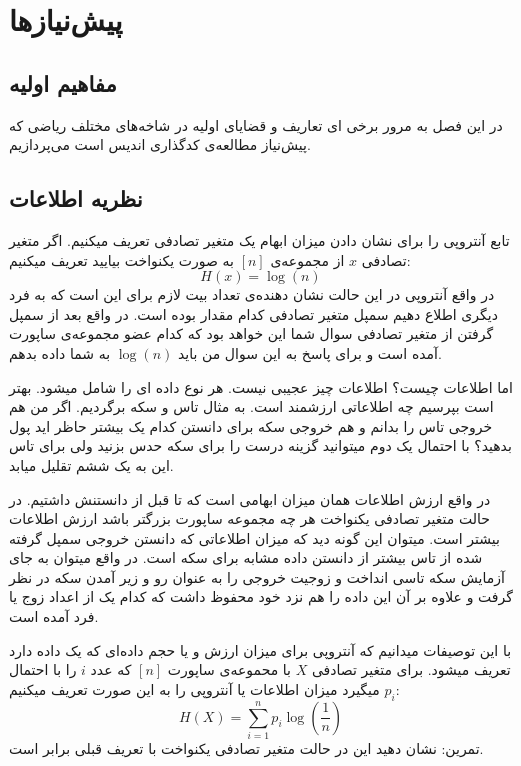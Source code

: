 \chapter{پیش‌نیازها}
\label{chapter:preliminaries}
\section{مفاهیم اولیه}

در این فصل به مرور برخی ای تعاریف و قضایای اولیه در شاخه‌های مختلف ریاضی که پیش‌نیاز مطالعه‌ی کدگذاری اندیس است می‌پردازیم.

\section{
    ‌نظریه اطلاعات
}

تابع آنتروپی را برای نشان دادن میزان ابهام یک متغیر تصادفی تعریف میکنیم. اگر متغیر تصادفی
$x$
از مجموعه‌ی
$[n]$
به صورت یکنواخت بیایید تعریف میکنیم:
$$H(x) = \log(n)$$
در واقع آنتروپی در این حالت نشان دهنده‌ی تعداد بیت لازم برای این است که به فرد دیگری اطلاع دهیم سمپل متغیر تصادفی کدام مقدار بوده است. در واقع بعد از سمپل گرفتن از متغیر تصادفی سوال شما این خواهد بود که کدام عضو مجموعه‌ی ساپورت آمده است و برای پاسخ به این سوال من باید
$\log(n)$
به شما داده بدهم.

اما اطلاعات چیست؟ اطلاعات چیز عجیبی نیست. هر نوع داده ای را شامل میشود. بهتر است بپرسیم چه اطلاعاتی ارزشمند است. به مثال تاس و سکه برگردیم. اگر من هم خروجی تاس را بدانم و هم خروجی سکه برای دانستن کدام یک بیشتر حاظر اید پول بدهید؟ با احتمال یک دوم میتوانید گزینه درست را برای سکه حدس بزنید ولی برای تاس این به یک ششم تقلیل میابد.

در واقع ارزش اطلاعات همان میزان ابهامی است که تا قبل از دانستنش داشتیم. در حالت متغیر تصادفی یکنواخت هر چه مجموعه ساپورت بزرگتر باشد ارزش اطلاعات بیشتر است. میتوان این گونه دید که میزان اطلاعاتی که دانستن خروجی سمپل گرفته شده از تاس بیشتر از دانستن داده مشابه برای سکه است. در واقع میتوان به جای آزمایش سکه تاسی انداخت و زوجیت خروجی را به عنوان رو و زیر آمدن سکه در نظر گرفت و علاوه بر آن این داده را هم نزد خود محفوظ داشت که کدام یک از اعداد زوج یا فرد آمده است.

با این توصیفات میدانیم که آنتروپی برای میزان ارزش و یا حجم داده‌ای که یک داده دارد تعریف میشود. برای متغیر تصادفی
$X$
با محموعه‌ی ساپورت
$[n]$
که عدد
$i$
را با احتمال
$p_i$
میگیرد میزان اطلاعات یا آنتروپی را به این صورت تعریف میکنیم:
$$H(X) = \sum_{i = 1}^{n} p_i \log(\frac{1}{n})$$
تمرین: نشان دهید این در حالت متغیر تصادفی یکنواخت با تعریف قبلی برابر است.

